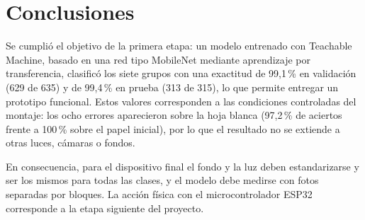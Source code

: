 \section{Conclusiones}
Se cumplió el objetivo de la primera etapa: un modelo entrenado con Teachable Machine, basado en una red tipo MobileNet mediante aprendizaje por transferencia, clasificó los siete grupos con una exactitud de 99,1\,\% en validación (629 de 635) y de 99,4\,\% en prueba (313 de 315), lo que permite entregar un prototipo funcional. Estos valores corresponden a las condiciones controladas del montaje: los ocho errores aparecieron sobre la hoja blanca (97,2\,\% de aciertos frente a 100\,\% sobre el papel inicial), por lo que el resultado no se extiende a otras luces, cámaras o fondos.

En consecuencia, para el dispositivo final el fondo y la luz deben estandarizarse y ser los mismos para todas las clases, y el modelo debe medirse con fotos separadas por bloques. La acción física con el microcontrolador ESP32 corresponde a la etapa siguiente del proyecto.
